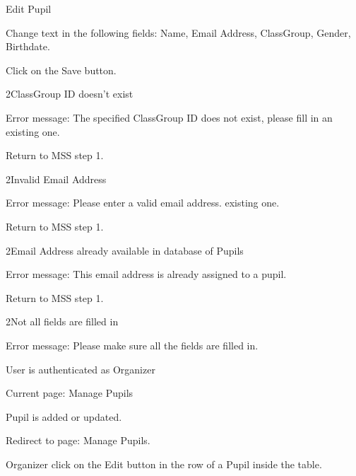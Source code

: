 
\begin{uc}{Edit Pupil}

    \begin{uc-mss}
    \item Change text in the following fields: Name, Email Address, ClassGroup,
        Gender, Birthdate.
    \item Click on the Save button.
    \end{uc-mss}

    \begin{uc-ext}

        \begin{uc-fail}{2}{ClassGroup ID doesn't exist}
        \item Error message: The specified ClassGroup ID does not exist, please
            fill in an existing one.
        \item Return to MSS step 1.
        \end{uc-fail}

        \begin{uc-fail}{2}{Invalid Email Address}
        \item Error message: Please enter a valid email address. existing one.
        \item Return to MSS step 1.
        \end{uc-fail}

        \begin{uc-fail}{2}{Email Address already available in database of
            Pupils}
        \item Error message: This email address is already assigned to a pupil.
        \item Return to MSS step 1.
        \end{uc-fail}

        \begin{uc-fail}{2}{Not all fields are filled in}
        \item Error message: Please make sure all the fields are filled in.
        \end{uc-fail}

    \end{uc-ext}

    \begin{uc-pre}
    \item User is authenticated as Organizer
    \item Current page: Manage Pupils
    \end{uc-pre}

    \begin{uc-post}
    \item Pupil is added or updated.
    \item Redirect to page: Manage Pupils.
    \end{uc-post}

    \begin{uc-trig}
        Organizer click on the Edit button in the row of a Pupil inside the
        table.
    \end{uc-trig}

\end{uc}
